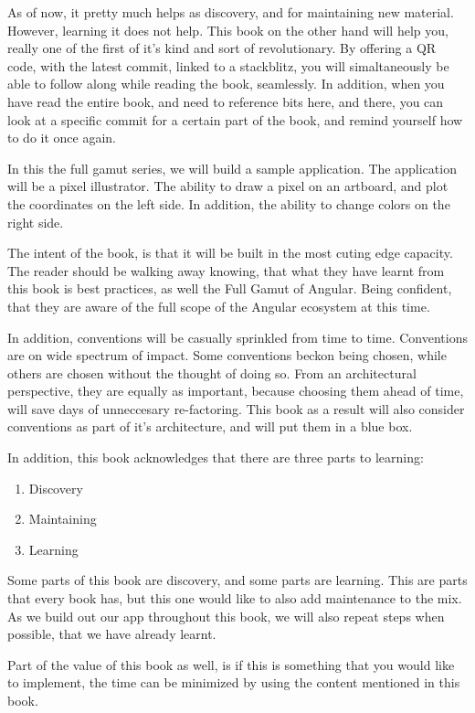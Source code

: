 As of now, it pretty much helps as discovery, and for maintaining new material.
However, learning it does not help. This book on the other hand will help you,
really one of the first of it's kind and sort of revolutionary. By offering a
QR code, with the latest commit, linked to a stackblitz, you will simaltaneously
be able to follow along while reading the book, seamlessly. In addition, when
you have read the entire book, and need to reference bits here, and there,
you can look at a specific commit for a certain part of the book, and remind
yourself how to do it once again.

In this the full gamut series, we will build a sample application. The
application will be a pixel illustrator. The ability to draw a pixel on an
artboard, and plot the coordinates on the left side. In addition, the ability to
change colors on the right side.

The intent of the book, is that it will be built in the most cuting edge
capacity. The reader should be walking away knowing, that what they have learnt
from this book is best practices, as well the Full Gamut of Angular. Being
confident, that they are aware of the full scope of the Angular ecosystem at
this time.

In addition, conventions will be casually sprinkled from time to time.
Conventions are on wide spectrum of impact. Some conventions beckon being
chosen, while others are chosen without the thought of doing so. From an
architectural perspective, they are equally as important, because choosing them
ahead of time, will save days of unneccesary re-factoring. This book as a result
will also consider conventions as part of it's architecture, and will put them
in a blue box.

In addition, this book acknowledges that there are three parts to learning:
\begin{enumerate}
  \item Discovery
  \item Maintaining
  \item Learning
\end{enumerate}

Some parts of this book are discovery, and some parts are learning. This are
parts that every book has, but this one would like to also add maintenance to
the mix. As we build out our app throughout this book, we will also repeat steps
when possible, that we have already learnt.

Part of the value of this book as well, is if this is something that you would
like to implement, the time can be minimized by using the content mentioned
in this book.

